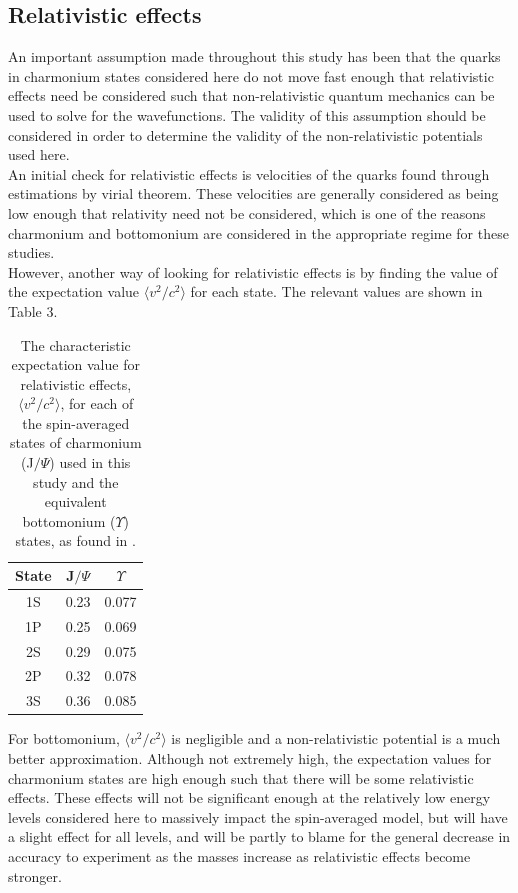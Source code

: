 \documentclass[10pt, twocolumn]{article}
\begin{document}
\subsection{Relativistic effects}
An important assumption made throughout this study has been that the quarks in charmonium states considered here do not move fast enough that relativistic effects need be considered such that non-relativistic quantum mechanics can be used to solve for the wavefunctions.
The validity of this assumption should be considered in order to determine the validity of the non-relativistic potentials used here.\\
An initial check for relativistic effects is velocities of the quarks found through estimations by virial theorem. 
These velocities are generally considered as being low enough that relativity need not be considered, which is one of the reasons charmonium and bottomonium are considered in the appropriate regime for these studies.\\
However, another way of looking for relativistic effects is by finding the value of the expectation value $\langle v^2/c^2\rangle$ for each state. 
The relevant values are shown in Table 3.
\begin{table}[H]
    \vspace{7pt}
    \centering
    \begin{tabular}{|c|c|c|}
        \hline
        \rowcolor{lightgray} State & J$/\Psi$ & $\Upsilon$ \\
        \hline
        1S & 0.23 & 0.077 \\
        \hline
        1P & 0.25 & 0.069 \\
        \hline
        2S & 0.29 & 0.075 \\
        \hline
        2P & 0.32 & 0.078 \\
        \hline
        3S & 0.36 & 0.085 \\
        \hline
    \end{tabular}
    \caption{The characteristic expectation value for relativistic effects, $\langle v^2/c^2\rangle$, for each of the spin-averaged states of charmonium (J$/\Psi$)  used in this study and the equivalent bottomonium ($\Upsilon$) states, as found in \cite{8}.}
\end{table}
For bottomonium, $\langle v^2/c^2\rangle$ is negligible and a non-relativistic potential is a much better approximation.
Although not extremely high, the expectation values for charmonium states are high enough such that there will be some relativistic effects. 
These effects will not be significant enough at the relatively low energy levels considered here to massively impact the spin-averaged model, but will have a slight effect for all levels, and will be partly to blame for the general decrease in accuracy to experiment as the masses increase as relativistic effects become stronger.\\
\end{document}

